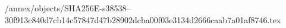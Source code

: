 /annex/objects/SHA256E-s38538--30f913c840d7cb14c57847d47b28902dcba00f03e3134d2666caab7a01af8746.tex
